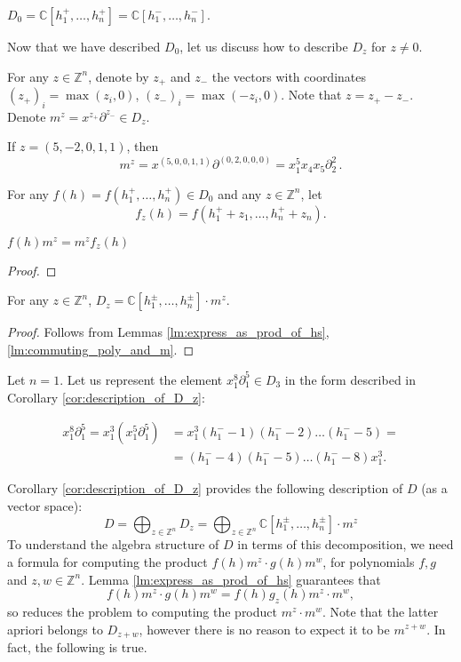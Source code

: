 \begin{corollary}
$D_0 = \mathbb{C}[h_1^+,\dots,h_n^+] = \mathbb{C}[h_1^-,\dots, h_n^-].$
\end{corollary}

Now that we have described $D_0$, let us discuss how to describe $D_z$ for $z\not=0$.

For any $z\in \mathbb{Z}^n$, denote by $z_+$ and $z_-$ the vectors with coordinates $(z_+)_i=\max(z_i,0)$, $(z_-)_i=\max(-z_i,0)$. Note that $z=z_+-z_-$. Denote $m^z=x^{z_+}\partial^{z_-}\in D_z$.

\begin{example}
If $z=(5,-2,0,1,1)$, then 
\[
m^z=x^{(5,0,0,1,1)}\partial^{(0,2,0,0,0)}=
x_1^5x_4x_5\partial_2^2\,.
\]
\end{example}

For any $f(h)=f(h_1^+, \dots, h_n^+)\in D_0$ and any $z\in \mathbb{Z}^n$, let $$f_z(h) = f(h_1^++z_1,\dots,h_n^++z_n).$$

\begin{lemma}\label{lm:commuting_poly_and_m}
$f(h)m^z = m^z f_z(h)$
\end{lemma}
\begin{proof}

\end{proof}

\begin{corollary} \label{cor:description_of_D_z}
For any $z\in \mathbb{Z}^n$, $D_z=\mathbb{C}[h_1^\pm,\dots,h_n^\pm]\cdot m^z$.
\end{corollary}
\begin{proof}
Follows from Lemmas \ref{lm:express_as_prod_of_hs}, \ref{lm:commuting_poly_and_m}.
\end{proof}

\begin{example}
Let $n=1$. Let us represent the element $x_1^8\partial_1^5\in D_3$ in the form described in Corollary \ref{cor:description_of_D_z}:

\begin{equation*}
    \begin{array}{ll}
         x_1^8\partial_1^5 = x_1^3(x_1^5\partial_1^5) &= 
         x_1^3(h_1^--1)(h_1^--2)\dots(h_1^--5) =\\
         &=(h_1^--4)(h_1^--5)\dots(h_1^--8)x_1^3.
    \end{array}
\end{equation*}
\end{example}

Corollary \ref{cor:description_of_D_z} provides the following description of $D$ (as a vector space):
$$
D=\bigoplus_{z\in\mathbb{Z}^n}D_z = \bigoplus_{z\in\mathbb{Z}^n}\mathbb{C}[h_1^\pm,\dots,h_n^\pm]\cdot m^z
$$
To understand the algebra structure of $D$ in terms of this decomposition, we need a formula for computing the product $f(h)m^z \cdot g(h)m^w$, for polynomials $f,g$ and $z,w\in\mathbb{Z}^n$. Lemma \ref{lm:express_as_prod_of_hs} guarantees that
$$
f(h)m^z \cdot g(h)m^w = f(h)g_z(h)m^z\cdot m^w,
$$
so reduces the problem to computing the product $m^z\cdot m^w$. Note that the latter apriori belongs to $D_{z+w}$, however there is no reason to expect it to be $m^{z+w}$. In fact, the following is true.

